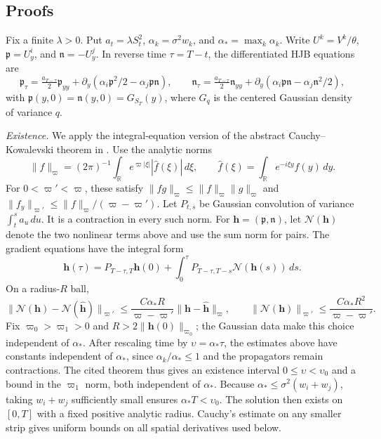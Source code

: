 \documentclass[mnsc]{informs3}
\begin{document}
\newpage
\begin{APPENDICES}


\section{Proofs}

{{
Fix a finite $\lambda>0$. Put $a_t=\lambda S_t^2$,
$\alpha_k=\sigma^2w_k$, and $\alpha_*=\max_k\alpha_k$.
Write $U^k=V^k/\theta$, ${\mathfrak p}=U_y^i$, and ${\mathfrak n}=-U_y^j$.
In reverse time $\tau=T-t$, the differentiated HJB equations are
\[
{\mathfrak p}_\tau=\tfrac{a_{T-\tau}}2{\mathfrak p}_{yy}
+\partial_y(\alpha_i{\mathfrak p}^2/2-\alpha_j{\mathfrak p}{\mathfrak n}),\qquad
{\mathfrak n}_\tau=\tfrac{a_{T-\tau}}2{\mathfrak n}_{yy}
+\partial_y(\alpha_i{\mathfrak p}{\mathfrak n}-\alpha_j{\mathfrak n}^2/2),
\]
with ${\mathfrak p}(y,0)={\mathfrak n}(y,0)=G_{S_T}(y)$, where $G_q$ is the centered
Gaussian density of variance $q$.

\emph{Existence.}
We apply the integral-equation version of the abstract
Cauchy--Kowalevski theorem in \citet[][Chapter III, Remark 2.3]{Nishida1978}.
Use the analytic norms
\[
\|f\|_\varpi=(2\pi)^{-1}\int_{\mathbb R}
e^{\varpi|\xi|}|\widehat f(\xi)|\,d\xi,
\qquad \widehat f(\xi)=\int_{\mathbb R}e^{-i\xi y}f(y)\,dy.
\]
For $0<\varpi'<\varpi$, these satisfy
$\|fg\|_\varpi\leq\|f\|_\varpi\|g\|_\varpi$ and
$\|f_y\|_{\varpi'}\leq\|f\|_\varpi/(\varpi-\varpi')$.
Let $P_{t,s}$ be Gaussian convolution of variance $\int_t^sa_u\,du$.
It is a contraction in every such norm.
For ${\mathbf h}=({\mathfrak p},{\mathfrak n})$, let $\mathscr N({\mathbf h})$ denote the two nonlinear terms
above and use the sum norm for pairs. The gradient equations have
the integral form
\begin{equation}\label{eq-equilibrium-gradient-mild}
{\mathbf h}(\tau)=P_{T-\tau,T}{\mathbf h}(0)
+\int_0^\tau P_{T-\tau,T-s}\mathscr N({\mathbf h}(s))\,ds.
\end{equation}
On a radius-$R$ ball,
\[
\|\mathscr N({\mathbf h})-\mathscr N(\widehat {\mathbf h})\|_{\varpi'}
\leq\frac{C\alpha_*R}{\varpi-\varpi'}\|{\mathbf h}-\widehat {\mathbf h}\|_\varpi,
\qquad
\|\mathscr N({\mathbf h})\|_{\varpi'}\leq
\frac{C\alpha_*R^2}{\varpi-\varpi'}.
\]
Fix $\varpi_0>\varpi_1>0$ and $R>2\|{\mathbf h}(0)\|_{\varpi_0}$;
the Gaussian data make this choice independent of $\alpha_*$.
After rescaling time by ${\upsilon}=\alpha_*\tau$, the estimates above have
constants independent of $\alpha_*$, since $\alpha_k/\alpha_*\leq1$
and the propagators remain contractions.
The cited theorem thus gives an existence interval $0\leq {\upsilon}<{\upsilon}_0$
and a bound in the $\varpi_1$ norm, both independent of $\alpha_*$.
Because $\alpha_*\leq\sigma^2(w_i+w_j)$, taking $w_i+w_j$ sufficiently
small ensures $\alpha_*T<{\upsilon}_0$. The solution then exists on $[0,T]$ with
a fixed positive analytic radius. Cauchy's estimate on any smaller strip
gives uniform bounds on all spatial derivatives used below.

}}
\end{APPENDICES}
\end{document}
